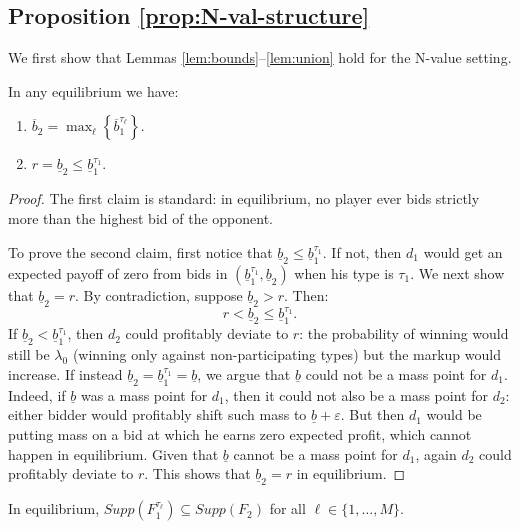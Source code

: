 \subsection*{Proposition \ref{prop:N-val-structure}}
We first show that Lemmas \ref{lem:bounds}--\ref{lem:union} hold for the N-value setting.

\begin{lem}\label{lem:N-bounds}
In any equilibrium we have:
\begin{enumerate}
    \item $\overline{b}_2 = \max_{\ell} \left\{ \overline{b}_1^{\tau_\ell} \right\}$.

    

    \item $r = \underline{b}_2 \leq \underline{b}_1^{\tau_1}$.
\end{enumerate}
\end{lem}

\begin{proof}
The first claim is standard: in equilibrium, no player ever bids strictly more than the highest bid of the opponent.

\noindent To prove the second claim, first notice that $\underline{b}_2 \leq \underline{b}_1^{\tau_1}$. If not, then $d_1$ would get an expected payoff of zero from bids in $(\underline{b}_1^{\tau_1}, \underline{b}_2)$ when his type is $\tau_1$. We next show that $\underline{b}_2 = r$. By contradiction, suppose $\underline{b}_2 > r$. Then:
\[
r < \underline{b}_2 \leq \underline{b}_1^{\tau_1}.
\]
If $\underline{b}_2 < \underline{b}_1^{\tau_1}$, then $d_2$ could profitably deviate to $r$: the probability of winning would still be $\lambda_0$ (winning only against non-participating types) but the markup would increase. If instead $\underline{b}_2 = \underline{b}_1^{\tau_1} = \underline{b}$, we argue that $\underline{b}$ could not be a mass point for $d_1$. Indeed, if $\underline{b}$ was a mass point for $d_1$, then it could not also be a mass point for $d_2$: either bidder would profitably shift such mass to $\underline{b} + \varepsilon$. But then $d_1$ would be putting mass on a bid at which he earns zero expected profit, which cannot happen in equilibrium. Given that $\underline{b}$ cannot be a mass point for $d_1$, again $d_2$ could profitably deviate to $r$. This shows that $\underline{b}_2 = r$ in equilibrium.
\end{proof}

\begin{lem}\label{lem:N-inclusion}
In equilibrium, $Supp(F_1^{\tau_\ell}) \subseteq Supp(F_2)$ for all $\ell \in \{1, \ldots, M\}$.
\end{lem}

